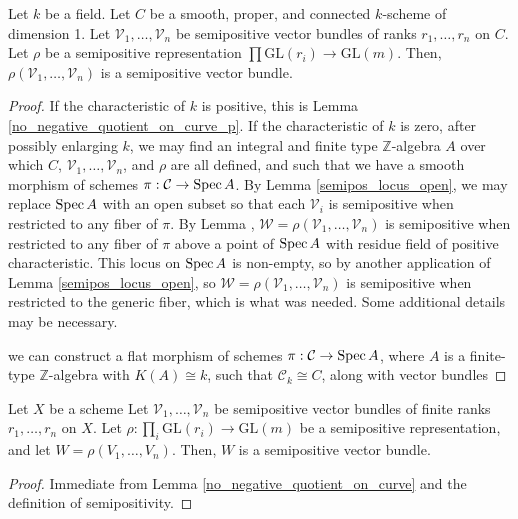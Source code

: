 \begin{lemma}\label{no_negative_quotient_on_curve}
Let $k$ be a field.
Let $C$ be a smooth, proper, and connected $k$-scheme of dimension 1. 
Let $\mathcal{V}_1,\ldots,\mathcal{V}_n$ be semipositive vector bundles of ranks $r_1,\ldots,r_n$ on $C$. 
Let $\rho$ be a semipositive representation $\prod \mathrm{GL}(r_i)\to \mathrm{GL}(m)$. 
Then, $\rho(\mathcal{V}_1,\ldots,\mathcal{V}_n)$ is a semipositive vector bundle.
\end{lemma}
\begin{proof}
If the characteristic of $k$ is positive, this is Lemma \ref{no_negative_quotient_on_curve_p}.
If the characteristic of $k$ is zero, after possibly enlarging $k$, we may find an integral and finite type $\mathbb{Z}$-algebra $A$ over which $C$, $\mathcal{V}_1,\ldots,\mathcal{V}_n$, and $\rho$ are all defined, and such that we have a smooth morphism of schemes $\pi:\mathcal{C}\to\mathop{\rm Spec} A$. 
By Lemma \ref{semipos_locus_open}, we may replace $\mathop{\rm Spec} A$ with an open subset so that each $\mathcal{V}_i$ is semipositive when restricted to any fiber of $\pi$. 
By Lemma \label{no_negative_quotient_on_curve_p}, $\mathcal{W}=\rho(\mathcal{V}_1,\ldots,\mathcal{V}_n)$ is semipositive when restricted to any fiber of $\pi$ above a point of $\mathop{\rm Spec} A$ with residue field of positive characteristic.
This locus on $\mathop{\rm Spec} A$ is non-empty, so by another application of Lemma \ref{semipos_locus_open}, so $\mathcal{W}=\rho(\mathcal{V}_1,\ldots,\mathcal{V}_n)$ is semipositive when restricted to the generic fiber, which is what was needed.
Some additional details may be necessary.


 we can construct a flat morphism of schemes $\pi:\mathcal{C}\to\mathop{\rm Spec} A$, where $A$ is a finite-type $\mathbb{Z}$-algebra with $K(A)\cong k$, such that $\mathcal{C}_k\cong C$, along with vector bundles 
\end{proof}


\begin{lemma}\label{apply_rho_still_semipos}
Let $X$ be a scheme
Let $\mathcal{V}_1,\ldots,\mathcal{V}_n$ be semipositive vector bundles of finite ranks $r_1,\ldots,r_n$ on $X$. 
Let $\rho:\prod_i \mathrm{GL}(r_i)\to \mathrm{GL}(m)$ be a semipositive representation, and let $W=\rho(V_1,\ldots,V_n)$. 
Then, $W$ is a semipositive vector bundle.
\end{lemma}

\begin{proof}
Immediate from Lemma \ref{no_negative_quotient_on_curve} and the definition of semipositivity.
\end{proof}


